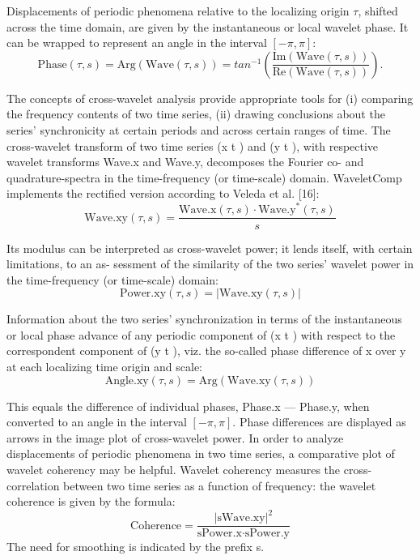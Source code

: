 \documentclass{biophys-new}
\begin{document}
Displacements of periodic phenomena relative to the localizing origin $\tau$, shifted across the time domain, are given by the instantaneous or local wavelet phase.
It can be wrapped to represent an angle in the interval $[-\pi,\pi]$:
\begin{equation}\label{eq:phase}
\text{Phase}(\tau, s)=\text{Arg}(\text{Wave}(\tau, s))=tan^{-1}\left(\frac{\text{Im}(\text{Wave}(\tau, s))}{\text{Re}(\text{Wave}(\tau, s))}\right).
\end{equation}

The concepts of cross-wavelet analysis provide appropriate tools for (i) comparing the frequency contents of two time series, (ii) drawing conclusions about the series’ synchronicity at certain periods and across certain ranges of time.
The cross-wavelet transform of two time series (x t ) and (y t ), with respective wavelet transforms Wave.x and Wave.y, decomposes the Fourier co- and quadrature-spectra in the time-frequency (or time-scale) domain.
WaveletComp implements the rectified version according to Veleda et al. [16]:
\begin{equation}\label{eq:wave.xy}
\text{Wave.xy}(\tau, s)=\frac{\text{Wave.x}(\tau, s)\cdot\text{Wave.y}^{\ast}(\tau, s)}{s}
\end{equation}

Its modulus can be interpreted as cross-wavelet power; it lends itself, with certain limitations, to an as-
sessment of the similarity of the two series’ wavelet power in the time-frequency (or time-scale) domain:
\begin{equation}\label{eq:power.xy}
\text{Power.xy}(\tau, s)=|\text{Wave.xy}(\tau, s)|
\end{equation}

Information about the two series’ synchronization in terms of the instantaneous or local phase advance of any periodic component of (x t ) with respect to the correspondent component of (y t ), viz. the so-called phase difference of x over y at each localizing time origin and scale:
\begin{equation}\label{eq:angle}
\text{Angle.xy}(\tau, s)=\text{Arg}(\text{Wave.xy}(\tau, s))
\end{equation}

This equals the difference of individual phases, Phase.x --- Phase.y, when converted to an angle in the
interval $[-\pi,\pi]$.
Phase differences are displayed as arrows in the image plot of cross-wavelet power.
In order to analyze displacements of periodic phenomena in two time series, a comparative plot of wavelet coherency may be helpful.
Wavelet coherency  measures the cross-correlation between two time series as a function of frequency: the wavelet coherence is given by the formula:
\begin{equation}\label{eq:coherence}
\text{Coherence}=\frac{|\text{sWave.xy}|^2}{\text{sPower.x}\cdot\text{sPower.y}}
\end{equation}
The need for smoothing is indicated by the prefix s.
\end{document}
